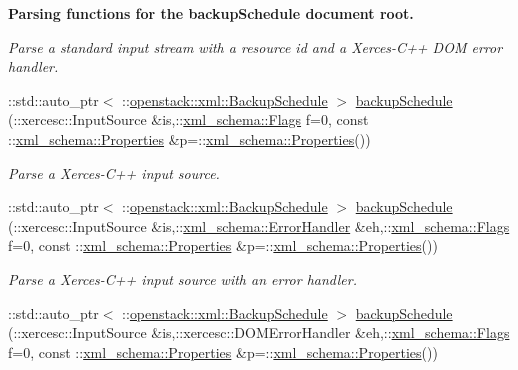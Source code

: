 \begin{Indent}{\bf Parsing functions for the backupSchedule document root.}
\begin{DoxyCompactItemize}
\begin{DoxyCompactList}\small\item\em Parse a standard input stream with a resource id and a Xerces-\/C++ DOM error handler. \item\end{DoxyCompactList}\item 
::std::auto\_\-ptr$<$ ::\hyperlink{classopenstack_1_1xml_1_1BackupSchedule}{openstack::xml::BackupSchedule} $>$ \hyperlink{namespaceopenstack_1_1xml_aee4d4ab6731c94b2f8415692aa11b172}{backupSchedule} (::xercesc::InputSource \&is,::\hyperlink{namespacexml__schema_affb4c227cbd9aa7453dd1dc5a1401943}{xml\_\-schema::Flags} f=0, const ::\hyperlink{namespacexml__schema_ad27ce19a7ee1d3b1064092648898f64c}{xml\_\-schema::Properties} \&p=::\hyperlink{namespacexml__schema_ad27ce19a7ee1d3b1064092648898f64c}{xml\_\-schema::Properties}())
\begin{DoxyCompactList}\small\item\em Parse a Xerces-\/C++ input source. \item\end{DoxyCompactList}\item 
::std::auto\_\-ptr$<$ ::\hyperlink{classopenstack_1_1xml_1_1BackupSchedule}{openstack::xml::BackupSchedule} $>$ \hyperlink{namespaceopenstack_1_1xml_a7fa46ab80e73c89f1f1cdc874082a7b2}{backupSchedule} (::xercesc::InputSource \&is,::\hyperlink{namespacexml__schema_ab1c9361bfd3b404eaabf0c31eded79dc}{xml\_\-schema::ErrorHandler} \&eh,::\hyperlink{namespacexml__schema_affb4c227cbd9aa7453dd1dc5a1401943}{xml\_\-schema::Flags} f=0, const ::\hyperlink{namespacexml__schema_ad27ce19a7ee1d3b1064092648898f64c}{xml\_\-schema::Properties} \&p=::\hyperlink{namespacexml__schema_ad27ce19a7ee1d3b1064092648898f64c}{xml\_\-schema::Properties}())
\begin{DoxyCompactList}\small\item\em Parse a Xerces-\/C++ input source with an error handler. \item\end{DoxyCompactList}\item 
::std::auto\_\-ptr$<$ ::\hyperlink{classopenstack_1_1xml_1_1BackupSchedule}{openstack::xml::BackupSchedule} $>$ \hyperlink{namespaceopenstack_1_1xml_aa5971e0f9d667e4449478ea62cb8f4ea}{backupSchedule} (::xercesc::InputSource \&is,::xercesc::DOMErrorHandler \&eh,::\hyperlink{namespacexml__schema_affb4c227cbd9aa7453dd1dc5a1401943}{xml\_\-schema::Flags} f=0, const ::\hyperlink{namespacexml__schema_ad27ce19a7ee1d3b1064092648898f64c}{xml\_\-schema::Properties} \&p=::\hyperlink{namespacexml__schema_ad27ce19a7ee1d3b1064092648898f64c}{xml\_\-schema::Properties}())

\end{DoxyCompactItemize}
\end{Indent}
